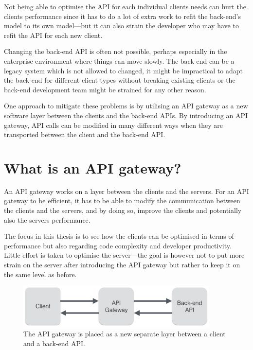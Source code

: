 \documentclass{cslthse-msc}
\begin{document}
Not being able to optimise the API for each individual clients needs can hurt the clients performance since it has to do a lot of extra work to refit the back-end's model to its own model---but it can also strain the developer who may have to refit the API for each new client.

Changing the back-end API is often not possible, perhaps especially in the enterprise environment where things can move slowly. The back-end can be a legacy system which is not allowed to changed, it might be impractical to adapt the back-end for different client types without breaking existing clients or the back-end development team might be strained for any other reason. 

One approach to mitigate these problems is by utilising an API gateway as a new software layer between the clients and the back-end APIs. By introducing an API gateway, API calls can be modified in many different ways when they are transported between the client and the back-end API.

\section{What is an API gateway?}
An API gateway works on a layer between the clients and the servers. For an API gateway to be efficient, it has to be able to modify the communication between the clients and the servers, and by doing so, improve the clients and potentially also the servers performance.

The focus in this thesis is to see how the clients can be optimised in terms of performance but also regarding code complexity and developer productivity. Little effort is taken to optimise the server---the goal is however not to put more strain on the server after introducing the API gateway but rather to keep it on the same level as before.

\begin{figure}[H]
  \centering
    \begin{center}
      \includegraphics[width=0.9\textwidth]{images/api_gateway.png}
    \end{center}
  \caption{The API gateway is placed as a new separate layer between a client and a back-end API.}
\end{figure}
\end{document}
